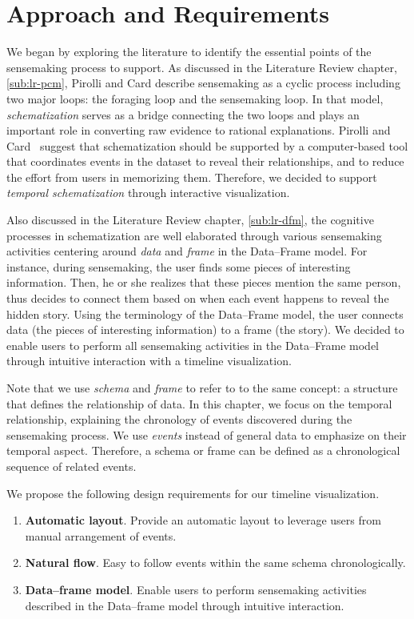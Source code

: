 \section{Approach and Requirements}

We began by exploring the literature to identify the essential points of the sensemaking process to support. As discussed in the Literature Review chapter, \autoref{sub:lr-pcm}, Pirolli and Card describe sensemaking as a cyclic process including two major loops: the foraging loop and the sensemaking loop. In that model, \emph{schematization} serves as a bridge connecting the two loops and plays an important role in converting raw evidence to rational explanations. Pirolli and Card~\cite{Pirolli2005} suggest that schematization should be supported by a computer-based tool that coordinates events in the dataset to reveal their relationships, and to reduce the effort from users in memorizing them. Therefore, we decided to support \emph{temporal schematization} through interactive visualization.

Also discussed in the Literature Review chapter, \autoref{sub:lr-dfm}, the cognitive processes in schematization are well elaborated through various sensemaking activities centering around \emph{data} and \emph{frame} in the Data--Frame model. For instance, during sensemaking, the user finds some pieces of interesting information. Then, he or she realizes that these pieces mention the same person, thus decides to connect them based on when each event happens to reveal the hidden story. Using the terminology of the Data--Frame model, the user connects data (the pieces of interesting information) to a frame (the story). We decided to enable users to perform all sensemaking activities in the Data--Frame model through intuitive interaction with a timeline visualization. 

Note that we use \emph{schema} and \emph{frame} to refer to to the same concept: a structure that defines the relationship of data. In this chapter, we focus on the temporal relationship, explaining the chronology of events discovered during the sensemaking process. We use \emph{events} instead of general data to emphasize on their temporal aspect. Therefore, a schema or frame can be defined as a chronological sequence of related events.

We propose the following design requirements for our timeline visualization.

\begin{enumerate}
	\item \textbf{Automatic layout}. Provide an automatic layout to leverage users from manual arrangement of events.
	\item \textbf{Natural flow}. Easy to follow events within the same schema chronologically.
	\item \textbf{Data--frame model}. Enable users to perform sensemaking activities described in the Data--frame model through intuitive interaction.
\end{enumerate}